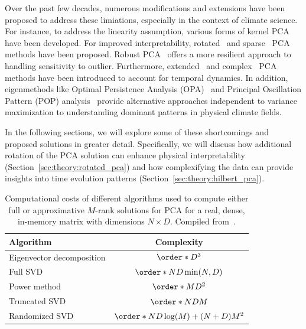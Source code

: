 Over the past few decades, numerous modifications and extensions have been proposed to address these limiations, especially in the context of climate science. For instance, to address the linearity assumption, various forms of kernel PCA \cite{webb_approach_1996,scholkopf_nonlinear_1998,bueso_nonlinear_2020} have been developed. For improved interpretability, rotated~\cite{richman_rotation_1986} and sparse~\cite{jolliffe_simplified_2002} PCA methods have been proposed. Robust PCA~\cite{candes_robust_2011} offers a more resilient approach to handling sensitivity to outlier. Furthermore, extended~\cite{weare_examples_1982,broomhead_extracting_1986} and complex~\cite{barnett_interaction_1983,horel_complex_1984} PCA methods have been introduced to account for temporal dynamics. In addition, eigenmethods like Optimal Persistence Analysis (OPA)~\cite{delsole_optimally_2001,delsole_low-frequency_2006} and Principal Oscillation Pattern (POP) analysis~\cite{hasselmann_pips_1988} provide alternative approaches independent to variance maximization to understanding dominant patterns in physical climate fields.

In the following sections, we will explore some of these shortcomings and proposed solutions in greater detail. Specifically, we will discuss how additional rotation of the PCA solution can enhance physical interpretability (Section~\ref{sec:theory:rotated_pca}) and how complexifying the data can provide insights into time evolution patterns (Section~\ref{sec:theory:hilbert_pca}).

\begin{table}
    \caption[Computational complexity of PCA algorithms]{Computational costs of different algorithms used to compute either full or approximative $M$-rank solutions for PCA for a real, dense, in-memory matrix with dimensions $N \times D$. Compiled from~\citet{bishop_pattern_2006,halko_finding_2011}.}
    \centering
    \label{tab:pca_algorithm_complexity}
    \begin{tabular}{l c}
        \toprule
        Algorithm & Complexity  \\ 
        \midrule
        Eigenvector decomposition & $\order*{D^3}$ \\
        Full SVD & $\order*{ND\min(N,D)}$ \\
        Power method & $\order*{MD^2}$  \\
        Truncated SVD & $\order*{NDM}$  \\
        Randomized SVD & $\order*{ND \log(M)+(N + D)M^2}$ \\
        \bottomrule
    \end{tabular}
\end{table}




